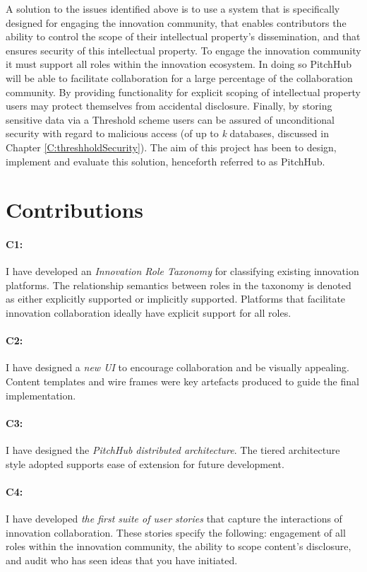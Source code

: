 A solution to the issues identified above is to use a system that is specifically designed for engaging the innovation community, that enables contributors the ability to control the scope of their intellectual property's dissemination, and that ensures security of this intellectual property. To engage the innovation community it must support all roles within the innovation ecosystem. In doing so PitchHub will be able to facilitate collaboration for a large percentage of the collaboration community. By providing functionality for explicit scoping of intellectual property users may protect themselves from accidental disclosure. Finally, by storing sensitive data via a Threshold scheme users can be assured of unconditional security with regard to malicious access (of up to \textit{k} databases, discussed in Chapter \ref{C:threshholdSecurity}).
The aim of this project has been to design, implement and evaluate this solution, henceforth referred to as PitchHub.

\section{Contributions}

\paragraph{C1:} I have developed an {\em Innovation Role Taxonomy} for classifying existing innovation platforms. The relationship semantics between roles in the taxonomy is denoted as either explicitly supported or implicitly supported. Platforms that facilitate innovation collaboration ideally have explicit support for all roles.

\paragraph{C2:} I have designed a {\em new UI} to encourage collaboration and be visually appealing. Content templates and wire frames were key artefacts produced to guide the final implementation.

\paragraph{C3:} I have designed the {\em PitchHub distributed architecture}. The tiered architecture style adopted supports ease of extension for future development.

\paragraph{C4:} I have developed {\em the first suite of user stories} that capture the interactions of innovation collaboration. These stories specify the following: engagement of all roles within the innovation community, the ability to scope content's disclosure, and audit who has seen ideas that you have initiated.

